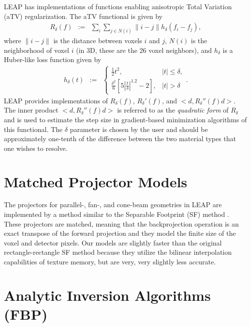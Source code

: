 \documentclass[11pt]{article}
\begin{document}
LEAP has implementations of functions enabling anisotropic Total Variation (aTV) regularization.  The aTV functional is given by
\begin{eqnarray*}
R_\delta(f) &:=& \sum_i \sum_{j \in N(i)} \|i-j\| h_\delta(f_i-f_j),
\end{eqnarray*}
where $\|i-j\|$ is the distance between voxels $i$ and $j$, $N(i)$ is the neighborhood of voxel $i$ (in 3D, these are the 26 voxel neighbors), and $h_\delta$ is a Huber-like loss function given by
\begin{eqnarray*}
h_\delta(t) &:=& \begin{cases} \frac{1}{2}t^2, & |t| \leq \delta, \\ \frac{\delta^2}{6}\left[5\left|\frac{t}{\delta}\right|^{1.2}-2\right], & |t| > \delta \end{cases}.
\end{eqnarray*}
LEAP provides implementations of $R_\delta(f)$, $R_{\delta}'(f)$, and $<d, R_{\delta}''(f)d>$.  The inner product $<d, R_{\delta}''(f)d>$ is referred to as the \textit{quadratic form} of $R_\delta$ and is used to estimate the step size in gradient-based minimization algorithms of this functional.  The $\delta$ parameter is chosen by the user and should be approximately one-tenth of the difference between the two material types that one wishes to resolve.

\section{Matched Projector Models}

The projectors for parallel-, fan-, and cone-beam geometries in LEAP are implemented by a method similar to the Separable Footprint (SF) method \cite{Long_TMI_2010}.  These projectors are matched, meaning that the backprojection operation is an exact transpose of the forward projection and they model the finite size of the voxel and detector pixels.  Our models are slightly faster than the original rectangle-rectangle SF method because they utilize the bilinear interpolation capabilities of texture memory, but are very, very slightly less accurate.

\section{Analytic Inversion Algorithms (FBP)}
\end{document}
